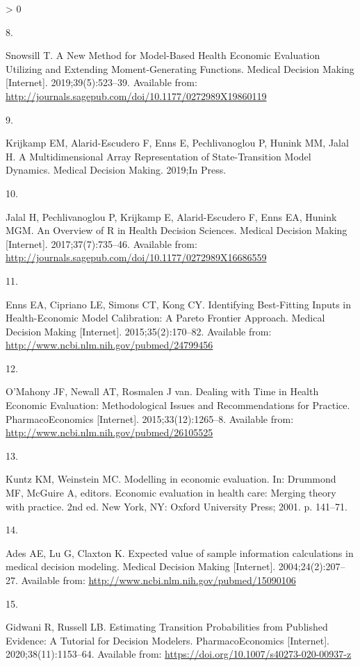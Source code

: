 \documentclass[
]{article}
\newlength{\cslhangindent}
\newlength{\csllabelwidth}
\newenvironment{CSLReferences}[2] %
 {%
  \setlength{\parindent}{0pt}
  \ifodd #1 \everypar{\setlength{\hangindent}{\cslhangindent}}\ignorespaces\fi
  \ifnum #2 > 0
  \setlength{\parskip}{#2\baselineskip}
  \fi
 }%
 {}
\newcommand{\CSLLeftMargin}[1]{\parbox[t]{\csllabelwidth}{#1}}
\newcommand{\CSLRightInline}[1]{\parbox[t]{\linewidth - \csllabelwidth}{#1}\break}
\begin{document}
\begin{CSLReferences}{0}{0}
\leavevmode\hypertarget{ref-Snowsill2019}{}%
\CSLLeftMargin{8. }
\CSLRightInline{Snowsill T. {A New Method for Model-Based Health Economic Evaluation Utilizing and Extending Moment-Generating Functions}. Medical Decision Making {[}Internet{]}. 2019;39(5):523--39. Available from: \url{http://journals.sagepub.com/doi/10.1177/0272989X19860119}}

\leavevmode\hypertarget{ref-Krijkamp2019}{}%
\CSLLeftMargin{9. }
\CSLRightInline{Krijkamp EM, Alarid-Escudero F, Enns E, Pechlivanoglou P, Hunink MM, Jalal H. {A Multidimensional Array Representation of State-Transition Model Dynamics}. Medical Decision Making. 2019;In Press. }

\leavevmode\hypertarget{ref-Jalal2017b}{}%
\CSLLeftMargin{10. }
\CSLRightInline{Jalal H, Pechlivanoglou P, Krijkamp E, Alarid-Escudero F, Enns EA, Hunink MGM. {An Overview of R in Health Decision Sciences}. Medical Decision Making {[}Internet{]}. 2017;37(7):735--46. Available from: \url{http://journals.sagepub.com/doi/10.1177/0272989X16686559}}

\leavevmode\hypertarget{ref-Enns2015e}{}%
\CSLLeftMargin{11. }
\CSLRightInline{Enns EA, Cipriano LE, Simons CT, Kong CY. {Identifying Best-Fitting Inputs in Health-Economic Model Calibration: A Pareto Frontier Approach}. Medical Decision Making {[}Internet{]}. 2015;35(2):170--82. Available from: \url{http://www.ncbi.nlm.nih.gov/pubmed/24799456}}

\leavevmode\hypertarget{ref-OMahony2015}{}%
\CSLLeftMargin{12. }
\CSLRightInline{O'Mahony JF, Newall AT, Rosmalen J van. {Dealing with Time in Health Economic Evaluation: Methodological Issues and Recommendations for Practice.} PharmacoEconomics {[}Internet{]}. 2015;33(12):1265--8. Available from: \url{http://www.ncbi.nlm.nih.gov/pubmed/26105525}}

\leavevmode\hypertarget{ref-Kuntz2001}{}%
\CSLLeftMargin{13. }
\CSLRightInline{Kuntz KM, Weinstein MC. {Modelling in economic evaluation}. In: Drummond MF, McGuire A, editors. Economic evaluation in health care: Merging theory with practice. 2nd ed. New York, NY: Oxford University Press; 2001. p. 141--71. }

\leavevmode\hypertarget{ref-Ades2004a}{}%
\CSLLeftMargin{14. }
\CSLRightInline{Ades AE, Lu G, Claxton K. {Expected value of sample information calculations in medical decision modeling.} Medical Decision Making {[}Internet{]}. 2004;24(2):207--27. Available from: \url{http://www.ncbi.nlm.nih.gov/pubmed/15090106}}

\leavevmode\hypertarget{ref-Gidwani2020}{}%
\CSLLeftMargin{15. }
\CSLRightInline{Gidwani R, Russell LB. {Estimating Transition Probabilities from Published Evidence: A Tutorial for Decision Modelers}. PharmacoEconomics {[}Internet{]}. 2020;38(11):1153--64. Available from: \url{https://doi.org/10.1007/s40273-020-00937-z}}


\end{CSLReferences}
\end{document}
